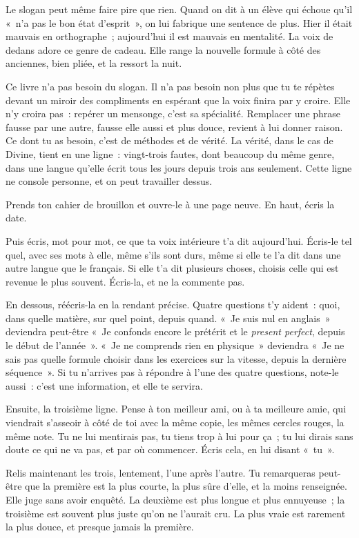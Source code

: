 \documentclass[10.5pt,twoside,openright]{book}
\newcommand{\soustitre}[1]{\par\vspace{1.1em}\noindent{\bfseries\color{accent}#1}\par\vspace{0.4em}\noindent}
\begin{document}
Le slogan peut même faire pire que rien. Quand on dit à un élève qui échoue qu’il « n’a pas le bon état d’esprit », on lui fabrique une sentence de plus. Hier il était mauvais en orthographe ; aujourd’hui il est mauvais en mentalité. La voix de dedans adore ce genre de cadeau. Elle range la nouvelle formule à côté des anciennes, bien pliée, et la ressort la nuit.

Ce livre n’a pas besoin du slogan. Il n’a pas besoin non plus que tu te répètes devant un miroir des compliments en espérant que la voix finira par y croire. Elle n’y croira pas : repérer un mensonge, c’est sa spécialité. Remplacer une phrase fausse par une autre, fausse elle aussi et plus douce, revient à lui donner raison. Ce dont tu as besoin, c’est de méthodes et de vérité. La vérité, dans le cas de Divine, tient en une ligne : vingt-trois fautes, dont beaucoup du même genre, dans une langue qu’elle écrit tous les jours depuis trois ans seulement. Cette ligne ne console personne, et on peut travailler dessus.

\soustitre{Ce soir, essaie ceci}

Prends ton cahier de brouillon et ouvre-le à une page neuve. En haut, écris la date.

Puis écris, mot pour mot, ce que ta voix intérieure t’a dit aujourd’hui. Écris-le tel quel, avec ses mots à elle, même s’ils sont durs, même si elle te l’a dit dans une autre langue que le français. Si elle t’a dit plusieurs choses, choisis celle qui est revenue le plus souvent. Écris-la, et ne la commente pas.

En dessous, réécris-la en la rendant précise. Quatre questions t’y aident : quoi, dans quelle matière, sur quel point, depuis quand. « Je suis nul en anglais » deviendra peut-être « Je confonds encore le prétérit et le \emph{present perfect}, depuis le début de l’année ». « Je ne comprends rien en physique » deviendra « Je ne sais pas quelle formule choisir dans les exercices sur la vitesse, depuis la dernière séquence ». Si tu n’arrives pas à répondre à l’une des quatre questions, note-le aussi : c’est une information, et elle te servira.

Ensuite, la troisième ligne. Pense à ton meilleur ami, ou à ta meilleure amie, qui viendrait s’asseoir à côté de toi avec la même copie, les mêmes cercles rouges, la même note. Tu ne lui mentirais pas, tu tiens trop à lui pour ça ; tu lui dirais sans doute ce qui ne va pas, et par où commencer. Écris cela, en lui disant « tu ».

Relis maintenant les trois, lentement, l’une après l’autre. Tu remarqueras peut-être que la première est la plus courte, la plus sûre d’elle, et la moins renseignée. Elle juge sans avoir enquêté. La deuxième est plus longue et plus ennuyeuse ; la troisième est souvent plus juste qu’on ne l’aurait cru. La plus vraie est rarement la plus douce, et presque jamais la première.
\end{document}
